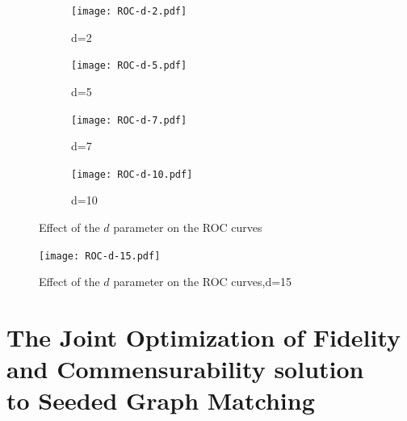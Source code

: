 \documentclass[12pt,oneside,final]{thesis}\usepackage[]{graphicx}\usepackage[]{color}
\begin{document}
\begin{figure}
 \centering
  \captionsetup[subfigure]{labelformat=empty}
        \begin{subfigure}[b]{0.5\textwidth}        
               \centerline{\texttt{[image: ROC-d-2.pdf]}}
                \caption{d=2}
                \label{fig:ROC-d-2}
        \end{subfigure}%
        \begin{subfigure}[b]{0.5\textwidth}           
                  \centerline{\texttt{[image: ROC-d-5.pdf]}}
                \caption{d=5}
                \label{fig:ROC-d-5}
        \end{subfigure}      
        \begin{subfigure}[b]{0.47\textwidth}             
               \texttt{[image: ROC-d-7.pdf]}
                \caption{d=7}
                \label{fig:ROC-d-7}
        \end{subfigure}          
               \begin{subfigure}[b]{0.47\textwidth}
                \centering
               \texttt{[image: ROC-d-10.pdf]}
                \caption{d=10}
                \label{fig:ROC-d-10}
        \end{subfigure}
         
        \caption{Effect of the $d$ parameter on the ROC curves}
        \label{fig:ROC-d}

\end{figure}

\begin{center}
\begin{figure}

                \centering
               \texttt{[image: ROC-d-15.pdf]}
                \caption{Effect of the $d$ parameter on the ROC curves,d=15}
                \label{fig:ROC-d-15}
       
\end{figure}
\end{center}






\chapter{The Joint Optimization of Fidelity and Commensurability  solution \\ to Seeded Graph Matching}
\label{sec:sgm-jofc}
\end{document}
